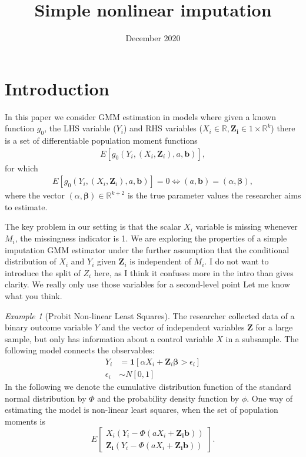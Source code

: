 \documentclass{article}
\title{Simple nonlinear imputation}
\author{}
\date{December 2020}
\theoremstyle{definition}
\theoremstyle{remark}
\newtheorem{example}{Example}
\begin{document}
\maketitle

\onehalfspacing


\section{Introduction}
In this paper we consider GMM estimation in models where given a known function $g_0$, the LHS variable ($Y_i$) and RHS variables ($X_i \in \mathbb{R},\mathbf{Z_i} \in {1} \times \mathbb{R}^k$) there is a set of {\color{red}differentiable} population moment functions
\begin{align}
E[g_0(Y_i, (X_i, \mathbf{Z}_i), a, \mathbf{b})],
\end{align}
for which
\begin{align}
E[g_0(Y_i, (X_i, \mathbf{Z}_i), a, \mathbf{b})] = 0 \iff (a,\mathbf{b})=(\alpha, \mathbf{\beta}),
\end{align}
where the vector $(\alpha, \mathbf{\beta})\in \mathbb{R}^{k+2}$ is the true parameter values the researcher aims to estimate.


The key problem in our setting is that the scalar $X_i$ variable is missing whenever $M_i$, the missingness indicator is 1. We are exploring the properties of a simple imputation GMM estimator under the further assumption that the conditional distribution of $X_i$ and $Y_i$ given $\mathbf{Z}_i$ is independent of $M_i$. 
{\color{red} I do not want to introduce the split of $Z_i$ here, as I think it confuses more in the intro than gives clarity. We really only use those variables for a second-level point Let me know what you think. 
}
\begin{example}[Probit Non-linear Least Squares]
	The researcher collected data of a binary outcome variable $Y$ and the vector of independent variables $\mathbf{Z}$ for a large sample, but only has information about a control variable $X$ in a subsample. The following model connects the observables:
	\begin{align}
	Y_i&= \mathbf{1}[\alpha X_i + \mathbf{Z}_i\mathbf{\beta}>\epsilon_i] \label{eq_probitEx1}\\
	\epsilon_i&\sim N[0,1] \label{eq_probitEx2}
	\end{align}
	In the following we denote the cumulative distribution function of the standard normal distribution by $\Phi$ and the probability density function by $\phi$. One way of estimating the model is non-linear least squares, when the set of population moments is
	\[E\left[\begin{array}{c}
	X_i(Y_i-\Phi(aX_i+\mathbf{Z_ib}))\\
	\mathbf{Z_i}(Y_i-\Phi(aX_i+\mathbf{Z_ib}))
	\end{array}
	\right].
	\]
\end{example}
\end{document}
